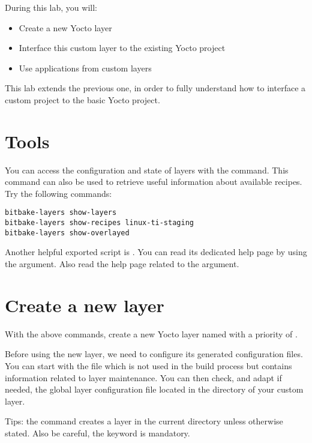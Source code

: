 
During this lab, you will:
\begin{itemize}
  \item Create a new Yocto layer
  \item Interface this custom layer to the existing Yocto project
  \item Use applications from custom layers
\end{itemize}

This lab extends the previous one, in order to fully understand how to interface
a custom project to the basic Yocto project.

\section{Tools}

You can access the configuration and state of layers with the
 command. This command can also be used to retrieve useful
information about available recipes. Try the following commands:
\begin{verbatim}
bitbake-layers show-layers
bitbake-layers show-recipes linux-ti-staging
bitbake-layers show-overlayed
\end{verbatim}

Another helpful exported script is . You can read its dedicated
help page by using the  argument. Also read the help page related to
the  argument.

\section{Create a new layer}

With the above commands, create a new Yocto layer named
 with a priority of .

Before using the new layer, we need to configure its generated configuration
files. You can start with the  file which is not used in the build
process but contains information related to layer maintenance. You can then
check, and adapt if needed, the global layer configuration file located in the
 directory of your custom layer.

Tips: the  command creates a layer in the current directory
unless otherwise stated. Also be careful, the  keyword is mandatory.

